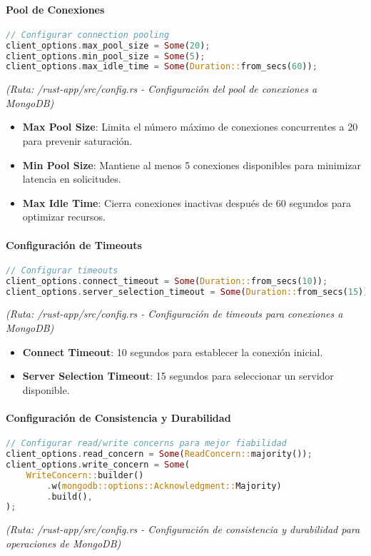 \documentclass[12pt,letterpaper]{article}
\begin{document}
\paragraph{Pool de Conexiones}
\begin{lstlisting}[language=rust]
// Configurar connection pooling
client_options.max_pool_size = Some(20);
client_options.min_pool_size = Some(5);
client_options.max_idle_time = Some(Duration::from_secs(60));
\end{lstlisting}
\textit{(Ruta: /rust-app/src/config.rs - Configuración del pool de conexiones a MongoDB)}

\begin{itemize}
    \item \textbf{Max Pool Size}: Limita el número máximo de conexiones concurrentes a 20 para prevenir saturación.
    \item \textbf{Min Pool Size}: Mantiene al menos 5 conexiones disponibles para minimizar latencia en solicitudes.
    \item \textbf{Max Idle Time}: Cierra conexiones inactivas después de 60 segundos para optimizar recursos.
\end{itemize}

\paragraph{Configuración de Timeouts}
\begin{lstlisting}[language=rust]
// Configurar timeouts
client_options.connect_timeout = Some(Duration::from_secs(10));
client_options.server_selection_timeout = Some(Duration::from_secs(15));
\end{lstlisting}
\textit{(Ruta: /rust-app/src/config.rs - Configuración de timeouts para conexiones a MongoDB)}

\begin{itemize}
    \item \textbf{Connect Timeout}: 10 segundos para establecer la conexión inicial.
    \item \textbf{Server Selection Timeout}: 15 segundos para seleccionar un servidor disponible.
\end{itemize}

\paragraph{Configuración de Consistencia y Durabilidad}
\begin{lstlisting}[language=rust]
// Configurar read/write concerns para mejor fiabilidad
client_options.read_concern = Some(ReadConcern::majority());
client_options.write_concern = Some(
    WriteConcern::builder()
        .w(mongodb::options::Acknowledgment::Majority)
        .build(),
);
\end{lstlisting}
\textit{(Ruta: /rust-app/src/config.rs - Configuración de consistencia y durabilidad para operaciones de MongoDB)}
\end{document}
